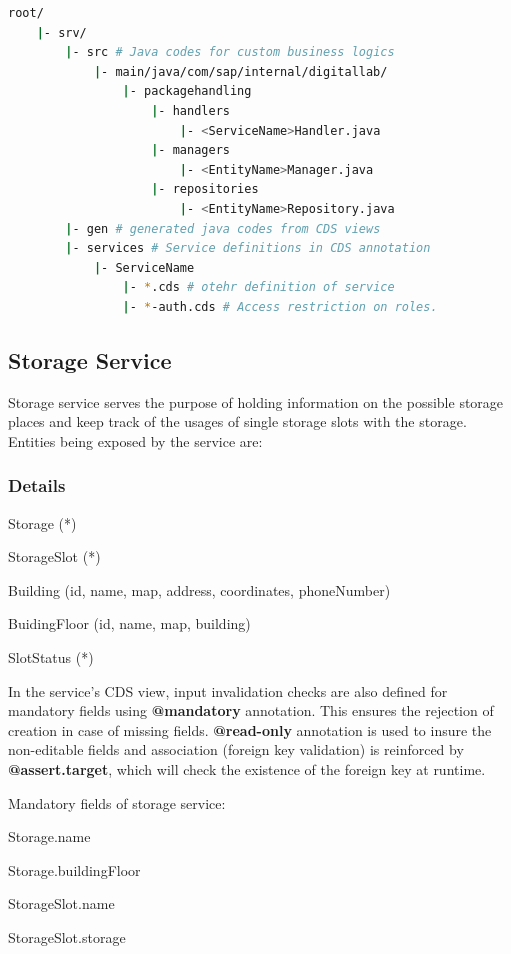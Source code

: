 \begin{lstlisting}[language={bash}]
root/
    |- srv/
        |- src # Java codes for custom business logics
            |- main/java/com/sap/internal/digitallab/
                |- packagehandling
                    |- handlers
                        |- <ServiceName>Handler.java
                    |- managers
                        |- <EntityName>Manager.java
                    |- repositories
                        |- <EntityName>Repository.java
        |- gen # generated java codes from CDS views
        |- services # Service definitions in CDS annotation
            |- ServiceName 
                |- *.cds # otehr definition of service
                |- *-auth.cds # Access restriction on roles.
\end{lstlisting}

\subsection{Storage Service}
Storage service serves the purpose of holding information on the possible storage places and keep track of the usages of single storage slots with the storage. Entities being exposed by the service are:

\subsubsection{Details}

\begin{compactenum}
	\item Storage (*)
    \item StorageSlot (*)
    \item Building (id, name, map, address, coordinates, phoneNumber)
    \item BuidingFloor (id, name, map, building)
    \item SlotStatus (*)
\end{compactenum}

\bigskip
In the service's CDS view, input invalidation checks are also defined for mandatory fields using \textbf{@mandatory} annotation. This ensures the rejection of creation in case of missing fields. \textbf{@read-only} annotation is used to insure the non-editable fields and association (foreign key validation) is reinforced by \textbf{@assert.target}, which will check the existence of the foreign key at runtime.

\bigskip
Mandatory fields of storage service:
\begin{compactenum}
	\item Storage.name
    \item Storage.buildingFloor
    \item StorageSlot.name
    \item StorageSlot.storage
\end{compactenum}

